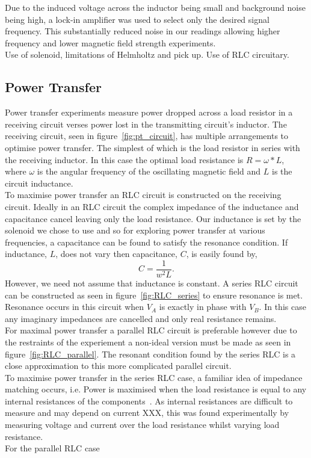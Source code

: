 \documentclass[11pt]{iopart}
\begin{document}
Due to the induced voltage across the inductor being small and background noise being high, a lock-in amplifier was used to select only the desired signal frequency. This substantially reduced noise in our readings allowing higher frequency and lower magnetic field strength experiments.\\

Use of solenoid, limitations of Helmholtz and pick up.
Use of RLC circuitary.

\subsection{Power Transfer}
Power transfer experiments measure power dropped across a load
resistor in a receiving circuit verses power lost in the transmitting
circuit's inductor. The receiving circuit, seen in
figure~\ref{fig:pt_circuit}, has multiple arrangements to optimise
power transfer. The simplest of which is the load resistor in series
with the receiving inductor. In this case the optimal load resistance
is $R = \omega*L$, where $\omega$ is the angular frequency of the
oscillating magnetic field and $L$ is the circuit inductance.\\
To maximise power transfer an RLC circuit is constructed on the
receiving circuit. Ideally in an RLC circuit the complex impedance of
the inductance and capacitance cancel leaving only the load
resistance. Our inductance is set by the solenoid we chose to use and
so for exploring power transfer at various frequencies, a capacitance
can be found to satisfy the resonance condition. If inductance, $L$, does not
vary then capacitance, $C$, is easily found
by,
\begin{equation}
  C = \frac{1}{w^2L}.
\end{equation}
However, we need not assume that inductance is constant. A series RLC
circuit can be constructed as seen in figure~\ref{fig:RLC_series} to
ensure resonance is met. Resonance occurs in this circuit when $V_A$
is exactly in phase with $V_B$. In this case any imaginary impedances
are cancelled and only real resistance remains. \\ For maximal power
transfer a parallel RLC circuit is preferable however due to the
restraints of the experiement a non-ideal version must be made as seen
in figure~\ref{fig:RLC_parallel}. The resonant condition found by the
series RLC is a close approximation to this more complicated parallel
circuit. \\

To maximise power transfer in the series RLC case, a familiar idea of
impedance matching occurs, i.e. Power is maximised when the load
resistance is equal to any internal resistances of the
components~\cite{XXX}. As internal resistances are difficult to
measure and may depend on current XXX, this was found experimentally
by measuring voltage and current over the load resistance whilst
varying load resistance. \\
For the parallel RLC case
\end{document}
